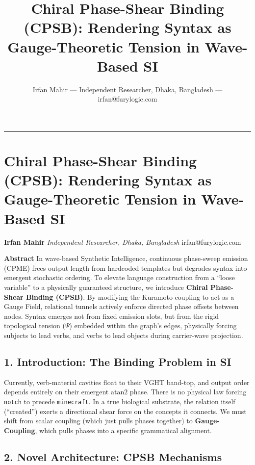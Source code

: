 \documentclass[
  11pt,
  a4paper,
]{article}
\title{Chiral Phase-Shear Binding (CPSB): Rendering Syntax as
Gauge-Theoretic Tension in Wave-Based SI}
\author{Irfan Mahir --- Independent Researcher, Dhaka, Bangladesh ---
irfan@furylogic.com}
\date{}
\begin{document}
\maketitle

{
\hypersetup{linkcolor=}
\setcounter{tocdepth}{3}
\tableofcontents
}
\begin{center}\rule{0.5\linewidth}{0.5pt}\end{center}

\section{Chiral Phase-Shear Binding (CPSB): Rendering Syntax as
Gauge-Theoretic Tension in Wave-Based
SI}\label{chiral-phase-shear-binding-cpsb-rendering-syntax-as-gauge-theoretic-tension-in-wave-based-si}

\textbf{Irfan Mahir} \emph{Independent Researcher, Dhaka, Bangladesh}
irfan@furylogic.com

\textbf{Abstract} In wave-based Synthetic Intelligence, continuous
phase-sweep emission (CPME) frees output length from hardcoded templates
but degrades syntax into emergent stochastic ordering. To elevate
language construction from a ``loose variable'' to a physically
guaranteed structure, we introduce \textbf{Chiral Phase-Shear Binding
(CPSB)}. By modifying the Kuramoto coupling to act as a Gauge Field,
relational tunnels actively enforce directed phase offsets between
nodes. Syntax emerges not from fixed emission slots, but from the rigid
topological tension (\(\Psi\)) embedded within the graph's edges,
physically forcing subjects to lead verbs, and verbs to lead objects
during carrier-wave projection.

\subsection{1. Introduction: The Binding Problem in
SI}\label{introduction-the-binding-problem-in-si}

Currently, verb-material cavities float to their VGHT band-top, and
output order depends entirely on their emergent \(\text{atan2}\) phase.
There is no physical law forcing \texttt{notch} to precede
\texttt{minecraft}. In a true biological substrate, the relation itself
(``created'') exerts a directional shear force on the concepts it
connects. We must shift from scalar coupling (which just pulls phases
together) to \textbf{Gauge-Coupling}, which pulls phases into a specific
grammatical alignment.

\subsection{2. Novel Architecture: CPSB
Mechanisms}\label{novel-architecture-cpsb-mechanisms}
\end{document}
